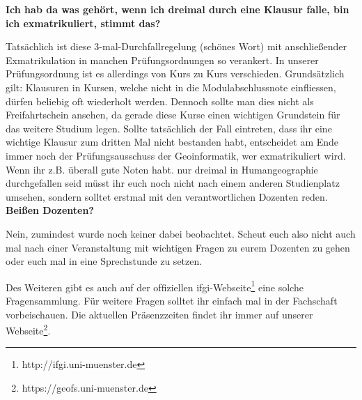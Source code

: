 \textbf{Ich hab da was gehört, wenn ich dreimal durch eine Klausur falle, bin ich exmatrikuliert, stimmt das?}

Tatsächlich ist diese 3-mal-Durchfallregelung (schönes Wort) mit anschließender Exmatrikulation in manchen Prüfungsordnungen so verankert. In unserer Prüfungsordnung ist es allerdings von Kurs zu Kurs verschieden. Grundsätzlich gilt: Klausuren in Kursen, welche nicht in die Modulabschlussnote einfliessen, dürfen beliebig oft wiederholt werden. Dennoch sollte man dies nicht als Freifahrtschein ansehen, da gerade diese Kurse einen wichtigen Grundstein für das weitere Studium legen.
Sollte tatsächlich der Fall eintreten, dass ihr eine wichtige Klausur zum dritten Mal nicht bestanden habt, entscheidet am Ende immer noch der Prüfungsausschuss der Geoinformatik, wer exmatrikuliert wird. Wenn ihr z.B. überall gute Noten habt. nur dreimal in Humangeographie durchgefallen seid müsst ihr euch noch nicht nach einem anderen Studienplatz umsehen, sondern solltet erstmal mit den verantwortlichen Dozenten reden.\\

\textbf{Beißen Dozenten?}

Nein, zumindest wurde noch keiner dabei beobachtet. Scheut euch also nicht auch mal nach einer Veranstaltung mit wichtigen Fragen zu eurem Dozenten zu gehen oder euch mal in eine Sprechstunde zu setzen.

Des Weiteren gibt es auch auf der ofﬁziellen ifgi-Webseite\footnote{http://ifgi.uni-muenster.de} eine solche Fragensammlung. Für weitere Fragen solltet ihr einfach mal in der Fachschaft vorbeischauen. Die aktuellen Präsenzzeiten ﬁndet ihr immer auf unserer Webseite\footnote{https://geofs.uni-muenster.de}.

